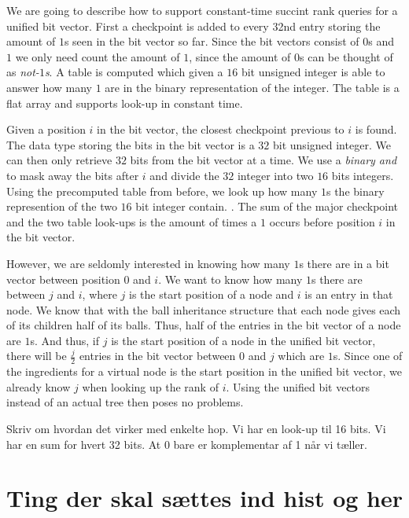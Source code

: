 We are going to describe how to support constant-time succint rank queries for a unified bit vector. First a checkpoint is added to every 32nd entry storing the amount of $1$s seen in the bit vector so far. Since the bit vectors consist of $0$s and $1$ we only need count the amount of $1$, since the amount of $0$s can be thought of as \emph{not-$1$s}. A table is computed which given a $16$ bit unsigned integer is able to answer how many $1$ are in the binary representation of the integer. The table is a flat array and supports look-up in constant time.

Given a position $i$ in the bit vector, the closest checkpoint previous to $i$ is found. The data type storing the bits in the bit vector is a $32$ bit unsigned integer. We can then only retrieve $32$ bits from the bit vector at a time. We use a \emph{binary and} to mask away the bits after $i$ and divide the $32$ integer into two $16$ bits integers. Using the precomputed table from before, we look up how many $1$s the binary represention of the two $16$ bit integer contain. . The sum of the major checkpoint and the two table look-ups is the amount of times a $1$ occurs before position $i$ in the bit vector. 

However, we are seldomly interested in knowing how many $1$s there are in a bit vector between position $0$ and $i$. We want to know how many $1$s there are between $j$ and $i$, where $j$ is the start position of a node and $i$ is an entry in that node. We know that with the ball inheritance structure that each node gives each of its children half of its balls. Thus, half of the entries in the bit vector of a node are $1$s. And thus, if $j$ is the start position of a node in the unified bit vector, there will be $\frac{j}{2}$ entries in the bit vector between $0$ and $j$ which are $1$s. Since one of the ingredients for a virtual node is the start position in the unified bit vector, we already know $j$ when looking up the rank of $i$. Using the unified bit vectors instead of an actual tree then poses no problems.


Skriv om hvordan det virker med enkelte hop. Vi har en look-up til 16 bits. Vi har en sum for hvert 32 bits. At 0 bare er komplementar af 1 når vi tæller.


\section{Ting der skal sættes ind hist og her}

